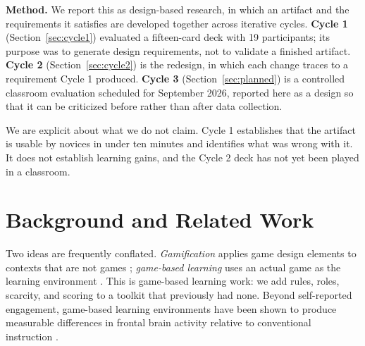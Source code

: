 \documentclass[10pt,twocolumn,letterpaper]{article}
\begin{document}
\textbf{Method.} We report this as design-based research, in which an artifact
and the requirements it satisfies are developed together across iterative cycles.
\textbf{Cycle 1} (Section~\ref{sec:cycle1}) evaluated a fifteen-card deck with 19
participants; its purpose was to generate design requirements, not to validate a
finished artifact. \textbf{Cycle 2} (Section~\ref{sec:cycle2}) is the redesign,
in which each change traces to a requirement Cycle 1 produced. \textbf{Cycle 3}
(Section~\ref{sec:planned}) is a controlled classroom evaluation scheduled for
September 2026, reported here as a design so that it can be criticized before
rather than after data collection.

We are explicit about what we do not claim. Cycle 1 establishes that the artifact
is usable by novices in under ten minutes and identifies what was wrong with it.
It does not establish learning gains, and the Cycle 2 deck has not yet been
played in a classroom.

\section{Background and Related Work}

Two ideas are frequently conflated. \emph{Gamification} applies game design
elements to contexts that are not games \cite{deterding2011gamification};
\emph{game-based learning} uses an actual game as the learning environment
\cite{plass2015gbl,landers2014gamified}. This is game-based learning work: we
add rules, roles, scarcity, and scoring to a toolkit that previously had none.
Beyond self-reported engagement, game-based learning environments have been shown
to produce measurable differences in frontal brain activity relative to
conventional instruction \cite{kober2020frontal}.
\end{document}
